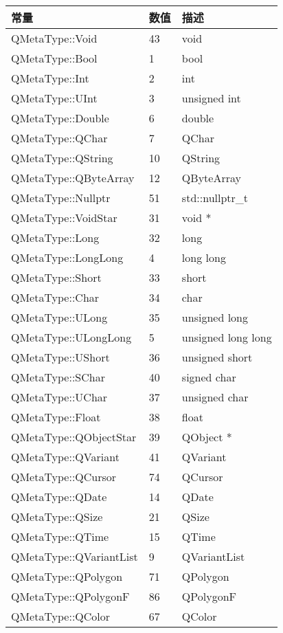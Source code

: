 \begin{longtable}[l]{|l|l|m{20em}|}   
\hline
常量 &	数值 &	描述 \\ 
\hline
QMetaType::Void &	43&	void \\
\hline
QMetaType::Bool	&1&	bool \\
\hline
QMetaType::Int	&2&	int \\
\hline
QMetaType::UInt	&3	&unsigned int \\
\hline
QMetaType::Double&	6	&double \\
\hline
QMetaType::QChar&	7	&QChar \\
\hline
QMetaType::QString	&10&	QString \\
\hline
QMetaType::QByteArray&	12&	QByteArray \\
\hline
QMetaType::Nullptr&	51&	std::nullptr\_t \\
\hline
QMetaType::VoidStar	&31&	void * \\
\hline
QMetaType::Long	&32	&long \\
\hline
QMetaType::LongLong	&4	&long long \\
\hline
QMetaType::Short	&33&	short \\
\hline
QMetaType::Char&	34	&char \\
\hline
QMetaType::ULong	&35	&unsigned long \\
\hline
QMetaType::ULongLong&	5	&unsigned long long \\
\hline
QMetaType::UShort&	36&	unsigned short \\
\hline
QMetaType::SChar&	40&	signed char \\
\hline
QMetaType::UChar&	37&	unsigned char \\
\hline
QMetaType::Float	&38&	float \\
\hline
QMetaType::QObjectStar	&39&	QObject * \\
\hline
QMetaType::QVariant	&41	&QVariant \\
\hline
QMetaType::QCursor	&74&	QCursor \\
\hline
QMetaType::QDate&	14	&QDate \\
\hline
QMetaType::QSize&	21&	QSize \\
\hline
QMetaType::QTime&	15	&QTime\\
\hline
QMetaType::QVariantList&	9	&QVariantList\\
\hline
QMetaType::QPolygon&	71	&QPolygon\\
\hline
QMetaType::QPolygonF&	86&	QPolygonF\\
\hline
QMetaType::QColor	&67&	QColor\\

\end{longtable}

